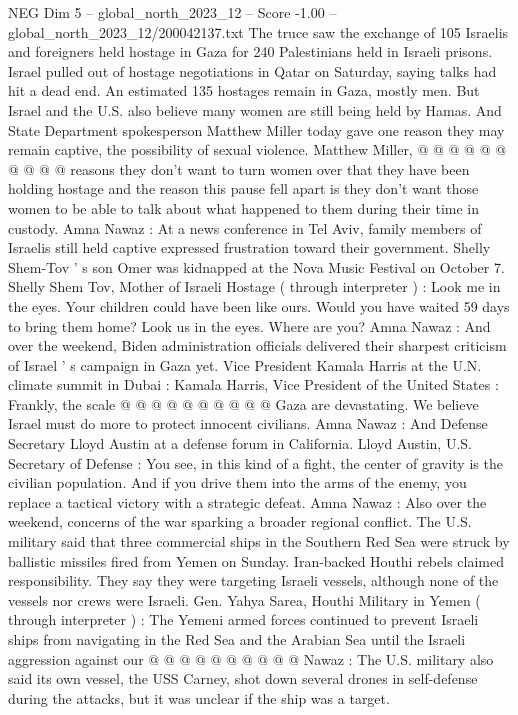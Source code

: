 \begin{textsample}{NEG Dim 5 – global\_north\_2023\_12 – Score -1.00 – global\_north\_2023\_12/200042137.txt}
The truce saw the exchange of 105 Israelis and foreigners held hostage in Gaza for 240 Palestinians held in Israeli prisons.
Israel pulled out of hostage negotiations in Qatar on Saturday, saying talks had hit a dead end.
An estimated 135 hostages remain in Gaza, mostly men.
But Israel and the U.S. also believe many women are still being held by Hamas.
And State Department spokesperson Matthew Miller today gave one reason they may remain captive, the possibility of sexual violence.
Matthew Miller, @ @ @ @ @ @ @ @ @ @ reasons they don't want to turn women over that they have been holding hostage and the reason this pause fell apart is they don't want those women to be able to talk about what happened to them during their time in custody.
Amna Nawaz : At a news conference in Tel Aviv, family members of Israelis still held captive expressed frustration toward their government.
Shelly Shem-Tov ' s son Omer was kidnapped at the Nova Music Festival on October 7.
Shelly Shem Tov, Mother of Israeli Hostage ( through interpreter ) : Look me in the eyes.
Your children could have been like ours.
Would you have waited 59 days to bring them home?
Look us in the eyes.
Where are you?
Amna Nawaz : And over the weekend, Biden administration officials delivered their sharpest criticism of Israel ' s campaign in Gaza yet.
Vice President Kamala Harris at the U.N. climate summit in Dubai : Kamala Harris, Vice President of the United States : Frankly, the scale @ @ @ @ @ @ @ @ @ @ Gaza are devastating.
We believe Israel must do more to protect innocent civilians.
Amna Nawaz : And Defense Secretary Lloyd Austin at a defense forum in California.
Lloyd Austin, U.S.
Secretary of Defense : You see, in this kind of a fight, the center of gravity is the civilian population.
And if you drive them into the arms of the enemy, you replace a tactical victory with a strategic defeat.
Amna Nawaz : Also over the weekend, concerns of the war sparking a broader regional conflict.
The U.S. military said that three commercial ships in the Southern Red Sea were struck by ballistic missiles fired from Yemen on Sunday.
Iran-backed Houthi rebels claimed responsibility.
They say they were targeting Israeli vessels, although none of the vessels nor crews were Israeli.
Gen.
Yahya Sarea, Houthi Military in Yemen ( through interpreter ) : The Yemeni armed forces continued to prevent Israeli ships from navigating in the Red Sea and the Arabian Sea until the Israeli aggression against our @ @ @ @ @ @ @ @ @ @ Nawaz : The U.S. military also said its own vessel, the USS Carney, shot down several drones in self-defense during the attacks, but it was unclear if the ship was a target.

\end{textsample}
